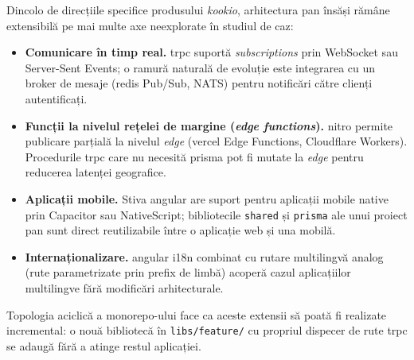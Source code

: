 Dincolo de direcțiile specifice produsului \textit{\gls{kookio}}, arhitectura \gls{pan} însăși rămâne extensibilă pe mai multe axe neexplorate în studiul de caz:

\begin{itemize}
  \item \textbf{Comunicare în timp real.} \gls{trpc} suportă \textit{subscriptions} prin WebSocket sau Server-Sent Events; o ramură naturală de evoluție este integrarea cu un broker de mesaje (\gls{redis} Pub/Sub, NATS) pentru notificări către clienți autentificați.

  \item \textbf{Funcții la nivelul rețelei de margine (\textit{edge functions}).} \gls{nitro} permite publicare parțială la nivelul \textit{edge} (\gls{vercel} Edge Functions, Cloudflare Workers). Procedurile \gls{trpc} care nu necesită \gls{prisma} pot fi mutate la \textit{edge} pentru reducerea latenței geografice.

  \item \textbf{Aplicații mobile.} Stiva \gls{angular} are suport pentru aplicații mobile native prin Capacitor sau NativeScript; bibliotecile \texttt{shared} și \texttt{prisma} ale unui proiect \gls{pan} sunt direct reutilizabile între o aplicație \gls{web} și una mobilă.

  \item \textbf{Internaționalizare.} \gls{angular} i18n combinat cu rutare multilingvă \gls{analog} (rute parametrizate prin prefix de limbă) acoperă cazul aplicațiilor multilingve fără modificări arhitecturale.
\end{itemize}

Topologia aciclică a \gls{monorepo}-ului face ca aceste extensii să poată fi realizate incremental: o nouă bibliotecă în \texttt{libs/feature/} cu propriul dispecer de rute \gls{trpc} se adaugă fără a atinge restul aplicației.
